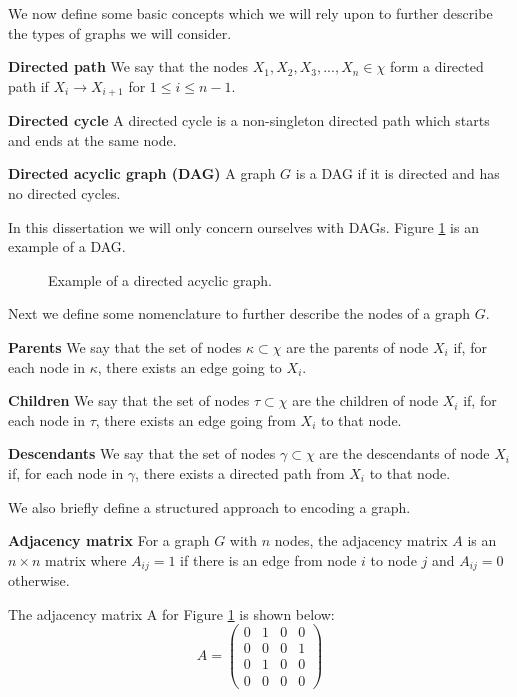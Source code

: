 We now define some basic concepts which we will rely upon to further describe the types of graphs we will consider.
\begin{defn}
\textbf{Directed path} We say that the nodes $X_1, X_2, X_3,..., X_n \in \chi$ form a directed path if $X_i \rightarrow X_{i+1}$ for $1 \leq i \leq n-1$. 
\end{defn}
\begin{defn}
\textbf{Directed cycle} A directed cycle is a non-singleton directed path which starts and ends at the same node.
\end{defn}
\begin{defn}
\textbf{Directed acyclic graph (DAG)} A graph $G$ is a DAG if it is directed and has no directed cycles.
\end{defn}
In this dissertation we will only concern ourselves with DAGs. Figure \ref{fig_dag} is an example of a DAG.
\begin{figure}[H] 
\centering
{}
\caption{Example of a directed acyclic graph.}
\label{fig_dag}
\end{figure}
Next we define some nomenclature to further describe the nodes of a graph $G$.
\begin{defn}
\textbf{Parents} We say that the set of nodes $\kappa \subset \chi$ are the parents of node $X_i$ if, for each node in $\kappa$, there exists an edge going to $X_i$.
\end{defn}
\begin{defn}
\textbf{Children} We say that the set of nodes $\tau \subset \chi$ are the children of node $X_i$ if, for each node in $\tau$, there exists an edge going from $X_i$ to that node.
\end{defn}
\begin{defn}
\textbf{Descendants} We say that the set of nodes $\gamma \subset \chi$ are the descendants of node $X_i$ if, for each node in $\gamma$, there exists a directed path from $X_i$ to that node.
\end{defn}
We also briefly define a structured approach to encoding a graph.
\begin{defn}
\textbf{Adjacency matrix} For a graph $G$ with $n$ nodes, the adjacency matrix $A$ is an $n \times n$ matrix where $A_{ij} = 1$ if there is an edge from node $i$ to node $j$ and $A_{ij} = 0$ otherwise. 
\end{defn}
The adjacency matrix A for Figure \ref{fig_dag} is shown below:
\begin{equation*}
A = \begin{pmatrix}
0 & 1 & 0 & 0 \\
0 & 0 & 0 & 1 \\
0 & 1 & 0 & 0 \\
0 & 0 & 0 & 0
\end{pmatrix}
\end{equation*}

